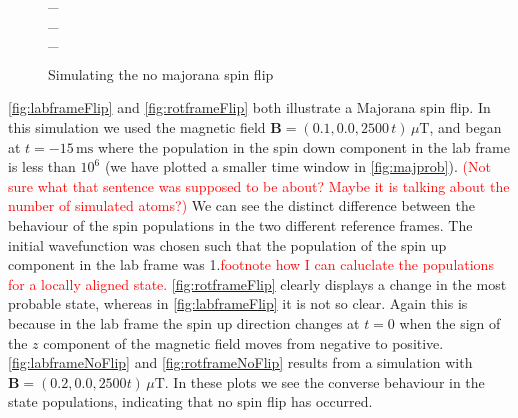 \begin{figure}
\_
\hspace{-14em}
\\\_
\hspace{-14em}
\\\_
\hspace{-12em}
\caption{Simulating the no majorana spin flip }\label{fig:majprob}
\end{figure}

\autoref{fig:labframeFlip} and \autoref{fig:rotframeFlip} both illustrate a Majorana spin flip.
In this simulation we used the magnetic field $\mathbf{B}=(0.1,0.0,2500\,t)\,\mu\mathrm{T}$, and began at $t=-15\,\mathrm{ms}$ where the population in the spin down component in the lab frame is less than $10^{6}$ (we have plotted a smaller time window in \autoref{fig:majprob}). \textcolor{red}{(Not sure what that sentence was supposed to be about? Maybe it is talking about the number of simulated atoms?)}
We can see the distinct difference between the behaviour of the spin populations in the two different reference frames.
The initial wavefunction was chosen such that the population of the spin up component in the lab frame was 1.\textcolor{red}{footnote how I can caluclate the populations for a locally aligned state.}
\autoref{fig:rotframeFlip} clearly displays a change in the most probable state, whereas in \autoref{fig:labframeFlip} it is not so clear.
Again this is because in the lab frame the spin up direction changes at $t=0$ when the sign of the $z$ component of the magnetic field moves from negative to positive.
\autoref{fig:labframeNoFlip} and \autoref{fig:rotframeNoFlip} results from a simulation with $\mathbf{B}=(0.2,0.0,2500t)\,\mu\mathrm{T}$.
In these plots we see the converse behaviour in the state populations, indicating that no spin flip has occurred.

